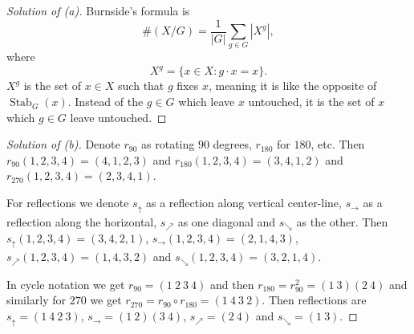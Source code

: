 \begin{proof}[Solution of (a)]
    Burnside's formula is 
    \[
        \#(X/G) = \frac{1}{|G|}\sum_{g\in G}|X^g|,
    \]
    where  
    \[
        X^g = \{x \in X : g \cdot x = x\}.
    \]
    $X^g$ is the set of $x \in X$ such that $g$ fixes $x$, meaning 
    it is like the opposite of $\operatorname{Stab}_G(x)$. Instead 
    of the $g \in G$ which leave $x$ untouched, it is the set 
    of $x$ which $g \in G$ leave untouched.
\end{proof}
\begin{proof}[Solution of (b)]
    Denote $r_{90}$ as rotating $90$ degrees, $r_{180}$ for 
    $180$, etc. 
    Then $r_{90}(1, 2, 3, 4) = (4,1,2,3)$ and 
    $r_{180}(1,2,3,4) = (3,4,1,2)$ and $r_{270}(1,2,3,4) 
    = (2,3,4,1)$. 

    For reflections we denote $s_{\uparrow}$ as a reflection 
    along vertical center-line, $s_{\rightarrow}$ as a reflection 
    along the horizontal, $s_{\nearrow}$ as one diagonal and 
    $s_{\searrow}$ as the other. 
    Then $s_{\uparrow}(1,2,3,4) = (3,4,2,1)$, 
    $s_{\rightarrow}(1,2,3,4) = (2,1,4,3)$, 
    $s_{\nearrow}(1,2,3,4) = (1,4,3,2)$ and 
    $s_{\searrow}(1,2,3,4) = (3,2,1,4)$.

    In cycle notation we get $r_{90} = (1 \ 2 \ 3 \ 4)$ and then 
    $r_{180} = r_{90}^2 = (1 \ 3)(2 \ 4)$ and similarly for $270$ we 
    get $r_{270} = r_{90} \circ r_{180} = (1 \ 4 \ 3 \ 2)$. 
    Then reflections are $s_{\uparrow} = (1 \ 4 \ 2 \ 3)$, 
    $s_{\rightarrow} = (1 \ 2)(3 \ 4)$, 
    $s_{\nearrow} = (2 \ 4)$ and $s_{\searrow} = (1 \ 3)$.
\end{proof}


